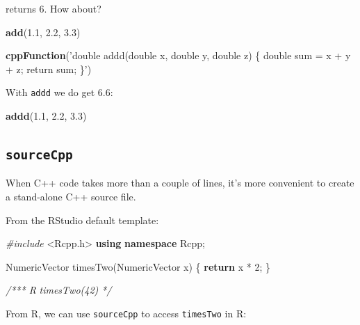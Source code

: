\documentclass[]{book}
\newenvironment{Shaded}{\begin{snugshade}}{\end{snugshade}}
\newcommand{\KeywordTok}[1]{\textcolor[rgb]{0.13,0.29,0.53}{\textbf{#1}}}
\newcommand{\DecValTok}[1]{\textcolor[rgb]{0.00,0.00,0.81}{#1}}
\newcommand{\FloatTok}[1]{\textcolor[rgb]{0.00,0.00,0.81}{#1}}
\newcommand{\StringTok}[1]{\textcolor[rgb]{0.31,0.60,0.02}{#1}}
\newcommand{\ImportTok}[1]{#1}
\newcommand{\CommentTok}[1]{\textcolor[rgb]{0.56,0.35,0.01}{\textit{#1}}}
\newcommand{\ControlFlowTok}[1]{\textcolor[rgb]{0.13,0.29,0.53}{\textbf{#1}}}
\newcommand{\PreprocessorTok}[1]{\textcolor[rgb]{0.56,0.35,0.01}{\textit{#1}}}
\newcommand{\NormalTok}[1]{#1}
\theoremstyle{definition}
\theoremstyle{definition}
\theoremstyle{definition}
\theoremstyle{remark}
\begin{document}
returns 6. How about?

\begin{Shaded}
\begin{Highlighting}[]
\KeywordTok{add}\NormalTok{(}\FloatTok{1.1}\NormalTok{, }\FloatTok{2.2}\NormalTok{, }\FloatTok{3.3}\NormalTok{)}
\end{Highlighting}
\end{Shaded}

\begin{Shaded}
\begin{Highlighting}[]
\KeywordTok{cppFunction}\NormalTok{(}\StringTok{'double addd(double x, double y, double z) \{}
\StringTok{  double sum = x + y + z;}
\StringTok{  return sum;}
\StringTok{\}'}\NormalTok{)}
\end{Highlighting}
\end{Shaded}

With \texttt{addd} we do get 6.6:

\begin{Shaded}
\begin{Highlighting}[]
\KeywordTok{addd}\NormalTok{(}\FloatTok{1.1}\NormalTok{, }\FloatTok{2.2}\NormalTok{, }\FloatTok{3.3}\NormalTok{)}
\end{Highlighting}
\end{Shaded}

\subsection{\texorpdfstring{\texttt{sourceCpp}}{sourceCpp}}\label{sourcecpp}

When C++ code takes more than a couple of lines, it's more convenient to
create a stand-alone C++ source file.

From the RStudio default template:

\begin{Shaded}
\begin{Highlighting}[]
\PreprocessorTok{#include }\ImportTok{<Rcpp.h>}
\KeywordTok{using} \KeywordTok{namespace}\NormalTok{ Rcpp;}

\NormalTok{NumericVector timesTwo(NumericVector x) \{}
  \ControlFlowTok{return}\NormalTok{ x * }\DecValTok{2}\NormalTok{;}
\NormalTok{\}}

\CommentTok{/*** R}
\CommentTok{timesTwo(42)}
\CommentTok{*/}
\end{Highlighting}
\end{Shaded}

From R, we can use \texttt{sourceCpp} to access \texttt{timesTwo} in R:
\end{document}
